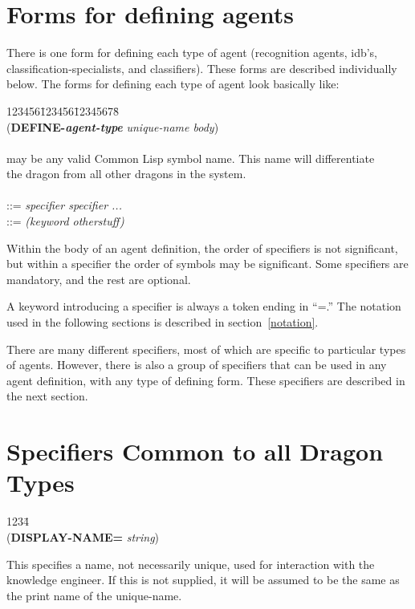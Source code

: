 \section{Forms for defining agents}


There is one form for defining each type of agent (recognition agents,
idb's, classification-specialists, and classifiers). These forms are
described individually below.  The forms for defining each type of
agent look basically like:


\begin{tabbing}
123456\=123456\=12345678\= \kill
\\
\>({\bf DEFINE-{\it agent-type\/}} {\it unique-name  body}) \\
\\
\> may be any valid Common Lisp symbol name. This
name will differentiate\\
\>\>\>the dragon from all other dragons in the system. \\
\\
\> \>::= {\it specifier specifier ...} \\
\>\> ::= {\it (keyword otherstuff)}
\\
\end{tabbing}
Within the body of an agent definition, the order of specifiers is not
significant, but within a specifier the order of symbols may be significant.
Some specifiers are mandatory, and the rest are optional.

A keyword introducing a specifier is always a token ending in ``=.''
The notation used in the following sections is described in
section~\ref{notation}.


There are many different specifiers, most of which are specific to
particular types of agents. However, there is also a group of
specifiers that can be used in any agent definition, with any type of
defining form. These specifiers are described in the next section.



\section{Specifiers Common to all Dragon Types}\label{general dragon
specifiers} 

\begin{tabbing}
1234\= \kill
\\
({\bf DISPLAY-NAME=} {\it string\/}) \\
\end{tabbing}
This specifies a name, not necessarily unique, used for interaction with
the knowledge engineer.
If this is not supplied, it will be assumed to be the
same as the print name of the unique-name.

